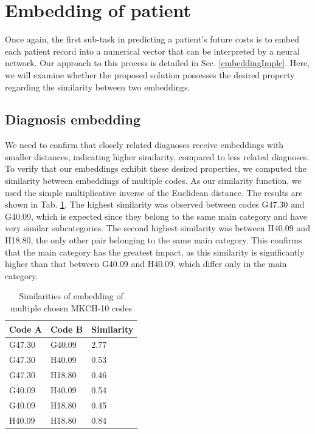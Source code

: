 
\section{Embedding of patient}
\label{embeddingRes}

Once again, the first sub-task in predicting a patient’s future costs is to embed each patient record into a numerical vector that can be interpreted by a neural network. Our approach to this process is detailed in Sec. \ref{embeddingImple}. Here, we will examine whether the proposed solution possesses the desired property regarding the similarity between two embeddings.

\subsection{Diagnosis embedding}

We need to confirm that closely related diagnoses receive embeddings with smaller distances, indicating higher similarity, compared to less related diagnoses. To verify that our embeddings exhibit these desired properties, we computed the similarity between embeddings of multiple codes. As our similarity function, we used the simple multiplicative inverse of the Euclidean distance. The results are shown in Tab. \ref{tab:diag_emb_show}. The highest similarity was observed between codes G47.30 and G40.09, which is expected since they belong to the same main category and have very similar subcategories. The second highest similarity was between H40.09 and H18.80, the only other pair belonging to the same main category. This confirms that the main category has the greatest impact, as this similarity is significantly higher than that between G40.09 and H40.09, which differ only in the main category.
\\

\begin{table}[!h]
	\centering
	\begin{tabular}{|l|l|l|}
		\hline
		Code A & Code B & Similarity \\ \hline
		G47.30 & G40.09 & 2.77       \\ \hline
		G47.30 & H40.09 & 0.53       \\ \hline
		G47.30 & H18.80 & 0.46       \\ \hline
		G40.09 & H40.09 & 0.54       \\ \hline
		G40.09 & H18.80 & 0.45       \\ \hline
		H40.09 & H18.80 & 0.84       \\ \hline
	\end{tabular}
	\caption{Similarities of embedding of multiple chosen MKCH-10 codes}
	\label{tab:diag_emb_show}
\end{table}  


